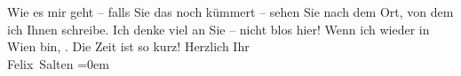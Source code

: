 \begin{ledgroupsized}[t]{13cm}
               Wie es mir geht – falls Sie das noch kümmert – sehen Sie nach dem Ort, von dem ich
               Ihnen schreibe. Ich denke viel an Sie – nicht blos hier! Wenn ich wieder in Wien bin, \label{K_L03596-2v}\label{K_L03596-2h}. Die Zeit ist so kurz!\pend
           \pstart
           Herzlich Ihr {\\[\baselineskip]}\spacefill\mbox{Felix Salten}\pend
           \leftskip=0em{}
         
         \endnumbering{}\end{ledgroupsized}  \newcommand{\dateiname}{L03596}\newcommand{\titel}{Felix Salten an Arthur Schnitzler, 8. 2. 1927}\newcommand{\editorInnen}{Martin Anton Müller und Laura Untner}
      